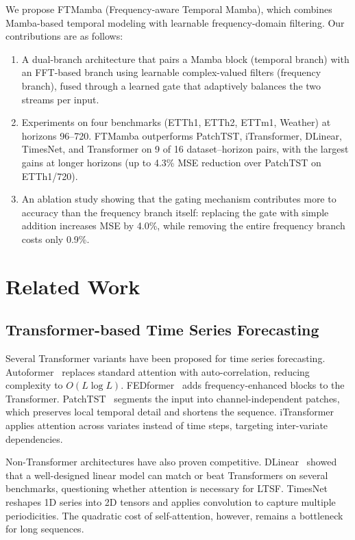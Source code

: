 \documentclass[electronics,article,submit,pdftex,moreauthors]{Definitions/mdpi}
\begin{document}
We propose FTMamba (Frequency-aware Temporal Mamba), which combines Mamba-based temporal modeling with learnable frequency-domain filtering. Our contributions are as follows:

\begin{enumerate}
\item A dual-branch architecture that pairs a Mamba block (temporal branch) with an FFT-based branch using learnable complex-valued filters (frequency branch), fused through a learned gate that adaptively balances the two streams per input.
\item Experiments on four benchmarks (ETTh1, ETTh2, ETTm1, Weather) at horizons 96--720. FTMamba outperforms PatchTST, iTransformer, DLinear, TimesNet, and Transformer on 9 of 16 dataset--horizon pairs, with the largest gains at longer horizons (up to 4.3\% MSE reduction over PatchTST on ETTh1/720).
\item An ablation study showing that the gating mechanism contributes more to accuracy than the frequency branch itself: replacing the gate with simple addition increases MSE by 4.0\%, while removing the entire frequency branch costs only 0.9\%.
\end{enumerate}

\section{Related Work}

\subsection{Transformer-based Time Series Forecasting}

Several Transformer variants have been proposed for time series forecasting. Autoformer~\cite{ref6} replaces standard attention with auto-correlation, reducing complexity to $O(L \log L)$. FEDformer~\cite{ref7} adds frequency-enhanced blocks to the Transformer. PatchTST~\cite{ref8} segments the input into channel-independent patches, which preserves local temporal detail and shortens the sequence. iTransformer~\cite{ref9} applies attention across variates instead of time steps, targeting inter-variate dependencies.

Non-Transformer architectures have also proven competitive. DLinear~\cite{ref13} showed that a well-designed linear model can match or beat Transformers on several benchmarks, questioning whether attention is necessary for LTSF. TimesNet~\cite{ref14} reshapes 1D series into 2D tensors and applies convolution to capture multiple periodicities. The quadratic cost of self-attention, however, remains a bottleneck for long sequences.
\end{document}
